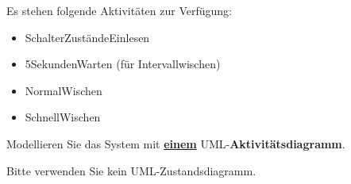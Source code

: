 Es stehen folgende Aktivitäten zur Verfügung:
\begin{itemize}
    \item SchalterZuständeEinlesen
    \item 5SekundenWarten (für Intervallwischen)
    \item NormalWischen
    \item SchnellWischen
\end{itemize}
Modellieren Sie das System mit \textbf{\underline{einem}} UML-\textbf{Aktivit\"atsdiagramm}.

Bitte verwenden Sie kein UML-Zustandsdiagramm. 